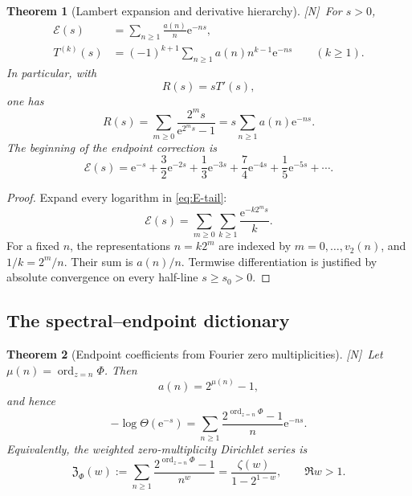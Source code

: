 \documentclass[11pt,oneside]{article}
\newtheorem{theorem}{Theorem}[section]
\theoremstyle{definition}
\theoremstyle{remark}
\newcommand{\e}{\mathrm e}
\newcommand{\ord}{\operatorname{ord}}
\newcommand{\vtwo}{v_2}
\newcommand{\statusN}{\textsf{[N]}}
\begin{document}
\begin{theorem}[Lambert expansion and derivative hierarchy]\label{thm:Lambert-tail}
\statusN\ For $s>0$,
\begin{align}
 \mathcal E(s)&=\sum_{n\ge1}\frac{a(n)}n\e^{-ns},         \label{eq:E-Lambert}\\
 T^{(k)}(s)&=(-1)^{k+1}\sum_{n\ge1}a(n)n^{k-1}\e^{-ns}
 \qquad(k\ge1).                                           \label{eq:T-derivatives}
\end{align}
In particular, with
\begin{equation}
 R(s)=sT'(s),                                               \label{eq:R-def}
\end{equation}
one has
\begin{equation}
 \boxed{
 R(s)=\sum_{m\ge0}\frac{2^ms}{\e^{2^ms}-1}
 =s\sum_{n\ge1}a(n)\e^{-ns}.}                             \label{eq:R-Lambert}
\end{equation}
The beginning of the endpoint correction is
\begin{equation}
 \mathcal E(s)=\e^{-s}+\frac32\e^{-2s}+\frac13\e^{-3s}
 +\frac74\e^{-4s}+\frac15\e^{-5s}+\cdots.               \label{eq:E-first}
\end{equation}
\end{theorem}

\begin{proof}
Expand every logarithm in \eqref{eq:E-tail}:
\[
 \mathcal E(s)=\sum_{m\ge0}\sum_{k\ge1}\frac{\e^{-k2^ms}}k.
\]
For a fixed $n$, the representations $n=k2^m$ are indexed by
$m=0,\ldots,\vtwo(n)$, and $1/k=2^m/n$.  Their sum is $a(n)/n$.
Termwise differentiation is justified by absolute convergence on every half-line
$s\ge s_0>0$.
\end{proof}

\subsection{The spectral--endpoint dictionary}

\begin{theorem}[Endpoint coefficients from Fourier zero multiplicities]
\label{thm:spectral-endpoint}
\statusN\ Let $\mu(n)=\ord_{z=n}\Phi$.  Then
\begin{equation}
 a(n)=2^{\mu(n)}-1,                                        \label{eq:a-mu}
\end{equation}
and hence
\begin{equation}
 \boxed{
 -\log\Theta(\e^{-s})
 =\sum_{n\ge1}\frac{2^{\ord_{z=n}\Phi}-1}{n}\e^{-ns}.}   \label{eq:spectral-endpoint}
\end{equation}
Equivalently, the weighted zero-multiplicity Dirichlet series is
\begin{equation}
 \boxed{
 \mathfrak Z_\Phi(w):=
 \sum_{n\ge1}\frac{2^{\ord_{z=n}\Phi}-1}{n^w}
 =\frac{\zeta(w)}{1-2^{1-w}},\qquad \Re w>1.}             \label{eq:weighted-zero-zeta}
\end{equation}
\end{theorem}
\end{document}
